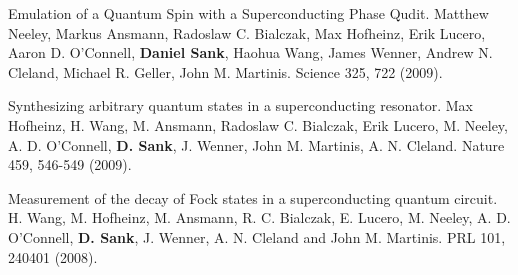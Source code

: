 \documentclass[margin=2cm,line]{res}
\newenvironment{list3}{
  \begin{list}{}{%
      \setlength{\itemsep}{0in}
      \setlength{\parsep}{0in} \setlength{\parskip}{0in}
      \setlength{\topsep}{0in} \setlength{\partopsep}{0in}
      \setlength{\leftmargin}{0.2in}}}{\end{list}}
\begin{document}
\begin{resume}
\begin{list3}
\item Emulation of a Quantum Spin with a Superconducting Phase Qudit. Matthew Neeley, Markus Ansmann, Radoslaw C. Bialczak, Max Hofheinz, Erik Lucero, Aaron D. O'Connell, \textbf{Daniel Sank}, Haohua Wang, James Wenner, Andrew N. Cleland, Michael R. Geller, John M. Martinis. Science 325, 722 (2009). \\

\item Synthesizing arbitrary quantum states in a superconducting resonator. Max Hofheinz, H. Wang, M. Ansmann, Radoslaw C. Bialczak, Erik Lucero, M. Neeley, A. D. O'Connell, \textbf{D. Sank}, J. Wenner, John M. Martinis, A. N. Cleland. Nature 459, 546-549 (2009). \\

\item Measurement of the decay of Fock states in a superconducting quantum circuit. H. Wang, M. Hofheinz, M. Ansmann, R. C. Bialczak, E. Lucero, M. Neeley, A. D. O'Connell, \textbf{D. Sank}, J. Wenner, A. N. Cleland and John M. Martinis. PRL 101, 240401 (2008).
\\
\end{list3}


\end{resume}
\end{document}
